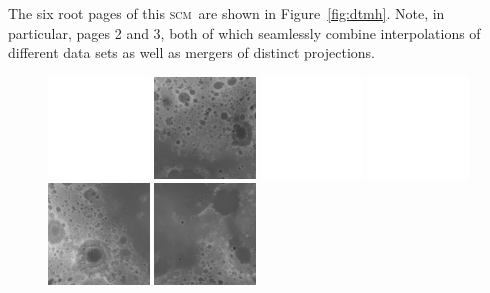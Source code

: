\documentclass[oneside,10pt]{memoir}
\newcommand{\scm}     {\textsc{scm}}
\begin{document}
\begin{Spacing}{1.1}
The six root pages of this \scm\ are shown in Figure~\ref{fig:dtmh}. Note, in particular, pages 2 and 3, both of which seamlessly combine interpolations of different data sets as well as mergers of distinct projections.

\begin{figure}
  \centering
  \includegraphics[width=0.24\textwidth]{fig/blank.pdf}
  \includegraphics[width=0.24\textwidth]{fig/dtmh2.png}
  \includegraphics[width=0.24\textwidth]{fig/blank.pdf}
  \includegraphics[width=0.24\textwidth]{fig/blank.pdf}\\\vspace{1pt}
  \includegraphics[width=0.24\textwidth]{fig/dtmh1.png}
  \includegraphics[width=0.24\textwidth]{fig/dtmh4.png}

\end{figure}
\end{Spacing}
\end{document}
